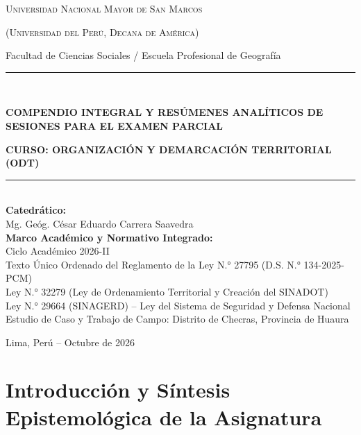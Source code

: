 \documentclass[11pt,a4paper]{article}
\begin{document}
\begin{titlepage}
    \centering
    \vspace*{1cm}
    {\scshape\LARGE Universidad Nacional Mayor de San Marcos\par}
    \vspace{0.3cm}
    {\scshape\large (Universidad del Perú, Decana de América)\par}
    \vspace{0.2cm}
    {\large Facultad de Ciencias Sociales / Escuela Profesional de Geografía\par}
    \vspace{2cm}
    
    \rule{\linewidth}{1.5pt}\\[0.4cm]
    {\huge\bfseries\color{primary} COMPENDIO INTEGRAL Y RESÚMENES ANALÍTICOS DE SESIONES PARA EL EXAMEN PARCIAL\par}
    \vspace{0.3cm}
    {\Large\bfseries\color{secondary} CURSO: ORGANIZACIÓN Y DEMARCACIÓN TERRITORIAL (ODT)\par}
    \rule{\linewidth}{1.5pt}\\[1.5cm]
    
    \textbf{\large Catedrático:}\\
    {\Large Mg. Geóg. César Eduardo Carrera Saavedra}\\[1cm]
    
    \textbf{\large Marco Académico y Normativo Integrado:}\\
    {\large Ciclo Académico 2026-II}\\[0.3cm]
    \small Texto Único Ordenado del Reglamento de la Ley N.° 27795 (D.S. N.° 134-2025-PCM)\\
    Ley N.° 32279 (Ley de Ordenamiento Territorial y Creación del SINADOT)\\
    Ley N.° 29664 (SINAGERD) -- Ley del Sistema de Seguridad y Defensa Nacional\\
    Estudio de Caso y Trabajo de Campo: Distrito de Checras, Provincia de Huaura\\[2cm]
    
    \vfill
    {\large Lima, Perú -- Octubre de 2026\par}
\end{titlepage}

\tableofcontents
\newpage

\section{Introducción y Síntesis Epistemológica de la Asignatura}
\end{document}
